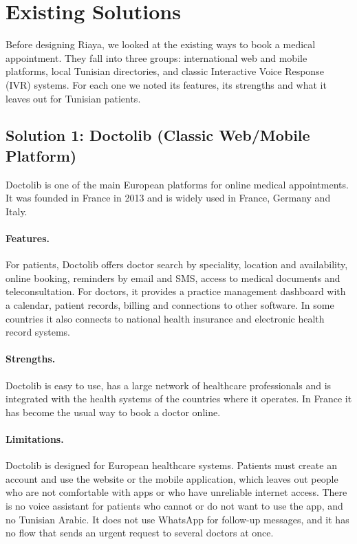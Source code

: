 \section{Existing Solutions}
Before designing Riaya, we looked at the existing ways to book a medical appointment. They fall into three groups: international web and mobile platforms, local Tunisian directories, and classic Interactive Voice Response (IVR) systems. For each one we noted its features, its strengths and what it leaves out for Tunisian patients.

\subsection{Solution 1: Doctolib (Classic Web/Mobile Platform)}
Doctolib is one of the main European platforms for online medical appointments. It was founded in France in 2013 and is widely used in France, Germany and Italy.

\paragraph{Features.} For patients, Doctolib offers doctor search by speciality, location and availability, online booking, reminders by email and SMS, access to medical documents and teleconsultation. For doctors, it provides a practice management dashboard with a calendar, patient records, billing and connections to other software. In some countries it also connects to national health insurance and electronic health record systems.

\paragraph{Strengths.} Doctolib is easy to use, has a large network of healthcare professionals and is integrated with the health systems of the countries where it operates. In France it has become the usual way to book a doctor online.

\paragraph{Limitations.} Doctolib is designed for European healthcare systems. Patients must create an account and use the website or the mobile application, which leaves out people who are not comfortable with apps or who have unreliable internet access. There is no voice assistant for patients who cannot or do not want to use the app, and no Tunisian Arabic. It does not use WhatsApp for follow-up messages, and it has no flow that sends an urgent request to several doctors at once.

